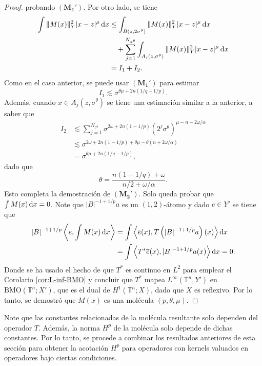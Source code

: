 \begin{proof}
	probando $(\mathbf{M_1'})$. Por otro lado, se tiene
	\begin{align*}
		\int \|M(x)\|_Y^2|x-z|^\mu \mathop{}\!\mathrm{d} x &\leq 
		\int_{B(z, 2\sigma^\theta)} \|M(x)\|_Y^2|x-z|^\mu \mathop{}\!\mathrm{d} x\\
		&  \quad + \sum_{j=1}^{N_{\sigma^\theta}} \int_{A_j(z, \sigma^\theta)} \|M(x)\|_Y^2|x-z|^\mu \mathop{}\!\mathrm{d} x \\
		 & = I_1 + I_2.
	\end{align*}
	Como en el caso anterior, se puede usar $(\mathbf{M_1'})$ para estimar 
	\begin{equation*}
		I_1 \lesssim \sigma^{\theta\mu + 2n(1/q - 1/p)}.
	\end{equation*}
	Además, cuando $x \in A_j(z, \sigma^\theta)$ se tiene una estimación similar a la anterior, a saber que
	\begin{align*}
		I_2  & \lesssim \sum_{j=1}^{N_{\sigma^\theta}} \sigma^{2\omega + 2n(1 - 1/p) } (2^j\sigma^\theta)^{\mu - n - 2\omega/\alpha} \\
		 &\lesssim \sigma^{ 2\omega + 2n(1-1/p) + \theta\mu -\theta(n + 2\omega/\alpha) } \\
		 & =\sigma^{ \theta\mu + 2n(1/q - 1/p) },
	\end{align*}
	dado que 
	\begin{equation*}
		\theta = \frac{n(1-1/q)+\omega}{ n/2 + \omega/\alpha }.
	\end{equation*}
	Esto completa la demostración de $(\mathbf{M_2'})$. Solo queda probar que $\int M(x)\mathop{}\!\mathrm{d} x=0$. Note que $|B|^{-1+1/p}a$  es un $(1, 2)$-átomo y dado $e \in Y'$ se tiene que
	\begin{align*}
		|B|^{-1+1/p}\left\langle e, \int M(x)\mathop{}\!\mathrm{d} x \right\rangle & = \int \left\langle \overline{e}(x) , T\left(  |B|^{-1+1/p}a\right)(x)\right\rangle \mathop{}\!\mathrm{d} x \\
		 &= \int \left\langle T^*\overline{e}(x) ,   |B|^{-1+1/p}a(x)\right\rangle \mathop{}\!\mathrm{d} x = 0.
	\end{align*}
	Donde se ha usado el hecho de que $T^*$ es continuo en $L^2$ para emplear el Corolario \ref{cor:L-inf-BMO} y concluir que $T^*$ mapea $L^\infty(\mathbb{T}^n, Y')$ en $\mathrm{BMO}(\mathbb{T}^n; X')$, que es el dual de $H^1(\mathbb{T}^n;X)$, dado que $X$ es reflexivo. Por lo tanto, se demostró que $M(x)$ es una molécula $(p, \theta,\mu)$.
\end{proof}
Note que las constantes relacionadas de la molécula resultante solo dependen del operador $T$. Además, la norma $H^p$ de la molécula solo depende de dichas constantes. Por lo tanto, se procede a combinar los resultados anteriores de esta sección para obtener la acotación $H^p$ para operadores con kernels valuados en operadores bajo ciertas condiciones. 
